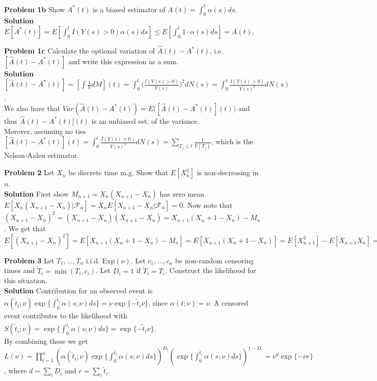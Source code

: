 \documentclass{article}
\begin{document}
\medskip

\textbf{Problem 1b} Show $A^*(t)$ is a biased estimator of $A(t) = \int_0^t\alpha(s)ds$. \\
\textbf{Solution} $E[A^*(t)] = E[\int_0^t I(Y(s)>0)\alpha(s)ds] \leq 
E[\int_0^t 1\cdot \alpha(s)ds] = A(t)$. 

\medskip

\textbf{Problem 1c} Calculate the optional variation of $\hat{A}(t)−A^*(t)$, i.e. $[\hat{A}(t)−A^*(t)]$ and write this expression as a sum. \\
\textbf{Solution} $[\hat{A}(t)−A^*(t)] = [\int \frac{1}{Y}dM](t) = \int_0^t \Big(\frac{I(Y(s)>0)}{Y(s)}\Big)^2 dN(s) = \int_0^t\frac{I(Y(s)>0)}{Y(s)^2} dN(s)$. \\ 
We also have that $Var( \hat{A}(t) - A^*(t)) = E\Big( [\hat{A}(t) - A^*(t)](t) \Big)$ and thus $\hat{A}(t) - A^*(t)](t)$ is an unbiased est. of the variance. \\ Morover, assuming no ties $[\hat{A}(t) - A^*(t)](t) = \int_0^t\frac{I(Y(s)>0)}{Y(s)^2} dN(s) = \sum_{T_j\leq t} \frac{1}{Y(T_j)}$, which is the Nelson-Aalen estimator.

\medskip

\textbf{Problem 2} Let $X_n$ be discrete time m.g. Show that $E[X^2_n]$ is non-decreasing in $n$.\\
\textbf{Solution} First show $M_{n+1} = X_n(X_{n+1}- X_n)$ has zero mean.  
$E[X_n(X_{n+1}- X_n)| \mathcal{F}_{n}] = X_n E[X_{n+1}- X_n| \mathcal{F}_{n}] = 0$. Now note that $(X_{n+1}- X_{n})^2 = (X_{n+1}- X_{n})(X_{n+1}- X_{n}) = X_{n+1}(X_{n}+ 1- X_{n}) - M_n$. We get that $E[(X_{n+1}- X_{n})^2] = E[ X_{n+1}(X_{n}+ 1- X_{n}) - M_n] = E[ X_{n+1}(X_{n}+ 1- X_{n})] = E[ X_{n+1}^2]- E[X_{n+1} X_{n}] = E[ X_{n+1}^2]- E[E[X_{n+1} X_{n} | \mathcal{F}_n]] =  E[ X_{n+1}^2]- E[ X_{n}^2 ] \geq 0$


\textbf{Problem 3} Let $T_1,...,T_n$ i.i.d. Exp$(\nu)$. Let $c_1,...,c_n$ be non-random censoring times and $\tilde{T}_i = \min(T_i,c_i)$. Let $D_i = 1$ if $\tilde{T}_i = T_i$. Construct the likelihood for this situation. \\
\textbf{Solution} Contribution for an observed event is $\alpha (\tilde{t}_i ; \nu) \exp \{ \int_0^{\tilde{t}_i} \alpha (s ; \nu)ds\} = \nu \exp \{-\tilde{t}_i\nu\}$, since $\alpha(t;\nu) = \nu$. A censored event contributes to the likelihood with $S(\tilde{t}_i ; \nu) = \exp \{ \int_0^{\tilde{t}_i} \alpha (s ; \nu)ds\} = \exp \{-\tilde{t}_i\nu\}$. \\ By combining these we get $L(\nu) = \prod_{i=1}^n (\alpha (\tilde{t}_i ; \nu) \exp \{ \int_0^{\tilde{t}_i} \alpha (s ; \nu)ds\})^{D_i} (\exp \{ \int_0^{\tilde{t}_i} \alpha (s ; \nu)ds\})^{1-D_i} = \nu^d \exp\{ -\nu r\}$, where $d = \sum_i D_i$ and $r= \sum_i \tilde{t}_i$.
\end{document}
